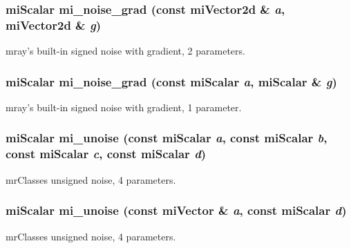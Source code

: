 \subsubsection{\setlength{\rightskip}{0pt plus 5cm}mi\-Scalar mi\_\-noise\_\-grad (const mi\-Vector2d \& {\em a}, mi\-Vector2d \& {\em g})\hspace{0.3cm}{\tt  [inline]}}\label{namespacersl_a52}


mray's built-in signed noise with gradient, 2 parameters. 

\subsubsection{\setlength{\rightskip}{0pt plus 5cm}mi\-Scalar mi\_\-noise\_\-grad (const mi\-Scalar {\em a}, mi\-Scalar \& {\em g})\hspace{0.3cm}{\tt  [inline]}}\label{namespacersl_a51}


mray's built-in signed noise with gradient, 1 parameter. 

\subsubsection{\setlength{\rightskip}{0pt plus 5cm}mi\-Scalar mi\_\-unoise (const mi\-Scalar {\em a}, const mi\-Scalar {\em b}, const mi\-Scalar {\em c}, const mi\-Scalar {\em d})\hspace{0.3cm}{\tt  [inline]}}\label{namespacersl_a118}


mr\-Classes unsigned noise, 4 parameters. 

\subsubsection{\setlength{\rightskip}{0pt plus 5cm}mi\-Scalar mi\_\-unoise (const mi\-Vector \& {\em a}, const mi\-Scalar {\em d})\hspace{0.3cm}{\tt  [inline]}}\label{namespacersl_a117}


mr\-Classes unsigned noise, 4 parameters. 

